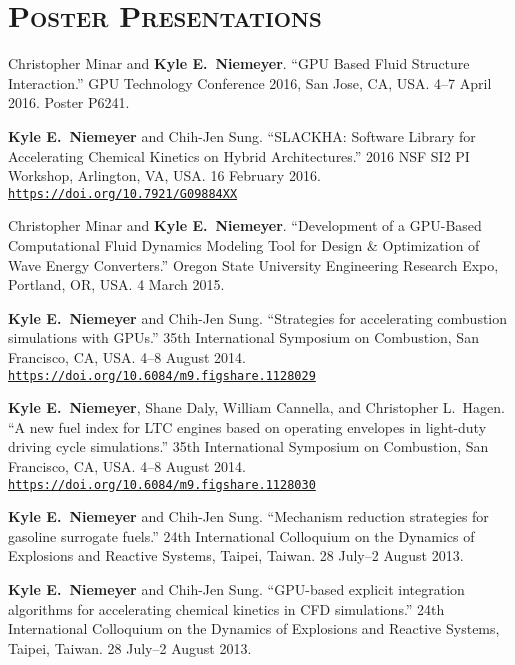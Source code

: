 \documentclass[margin,line,11pt]{res}
\makeatletter
\newlength{\bibhang}
\newlength{\bibsep}
 {\@listi \global\bibsep\itemsep \global\advance\bibsep by\parsep}
\newenvironment{bibenum*}
  {\renewcommand\labelenumi{\theenumi.}%
   \etaremune[
     topsep=0pt,
     itemsep=\bibsep,
     parsep=0pt,partopsep=0pt,
     itemindent=-\bibhang,
     leftmargin={\bibhang+\widthof{[999]}}]}
  {\endetaremune}
\newcommand*{\doi}[1]{\href{https://doi.org/#1}{\nolinkurl{https://doi.org/#1}}}
\makeatother
\begin{document}
\begin{resume}
\begin{bibenum*}
\end{bibenum*}

\section{\textsc{Poster Presentations}}

\begin{bibenum*}

\item Christopher Minar and \textbf{Kyle E.\ Niemeyer}.
``GPU Based Fluid Structure Interaction.''
GPU Technology Conference 2016, San Jose, CA, USA.
4--7 April 2016.
Poster P6241.

\item \textbf{Kyle E.\ Niemeyer} and Chih-Jen Sung.
``SLACKHA: Software Library for Accelerating Chemical Kinetics on Hybrid Architectures.'' 2016 NSF SI2 PI Workshop, Arlington, VA, USA.
16 February 2016.
\doi{10.7921/G09884XX}

\item Christopher Minar and \textbf{Kyle E.\ Niemeyer}.
``Development of a GPU-Based Computational Fluid Dynamics Modeling Tool for Design \& Optimization of Wave Energy Converters.''
Oregon State University Engineering Research Expo, Portland, OR, USA.
4 March 2015.

\item \textbf{Kyle E.\ Niemeyer} and Chih-Jen Sung.
``Strategies for accelerating combustion simulations with GPUs.''
35th International Symposium on Combustion, San Francisco, CA, USA.
4--8 August 2014.
\doi{10.6084/m9.figshare.1128029}

\item \textbf{Kyle E.\ Niemeyer}, Shane Daly, William Cannella, and Christopher L.\ Hagen.
``A new fuel index for LTC engines based on operating envelopes in light-duty driving cycle simulations.''
35th International Symposium on Combustion, San Francisco, CA, USA.
4--8 August 2014.
\doi{10.6084/m9.figshare.1128030}

\item \textbf{Kyle E.\ Niemeyer} and Chih-Jen Sung.
``Mechanism reduction strategies for gasoline surrogate fuels.''
24th International Colloquium on the Dynamics of Explosions and Reactive Systems, Taipei, Taiwan.
28 July--2 August 2013.

\item \textbf{Kyle E.\ Niemeyer} and Chih-Jen Sung.
``GPU-based explicit integration algorithms for accelerating chemical kinetics in CFD simulations.''
24th International Colloquium on the Dynamics of Explosions and Reactive Systems, Taipei, Taiwan.
28 July--2 August 2013.


\end{bibenum*}
\end{resume}
\end{document}

